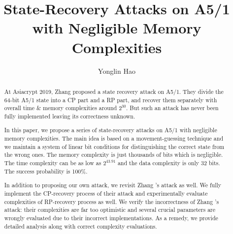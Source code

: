 
\renewcommand{\algorithmicrequire}{\textbf{Input:}}
\renewcommand{\algorithmicensure}{\textbf{Output:}}

        
\mainmatter
\title{State-Recovery Attacks on A5/1 with Negligible Memory Complexities}
\author{Yonglin Hao}
\maketitle


%




\begin{abstract}
At Asiacrypt 2019, Zhang \etal proposed a state recovery attack on A5/1.
They divide the 64-bit A5/1 state into a CP part and a RP part, and recover them separately with overall time \& memory complexities around $2^{30}$.
But such an attack has never been fully implemented leaving its correctness unknown.

In this paper, we propose a series of state-recovery attacks on A5/1 with negligible memory complexities.
The main idea is based on a movement-guessing technique and we maintain a system of linear bit conditions for distinguishing the correct state from the wrong ones.
The memory complexity is just thousands of bits which is negligible.
The time complexity can be as low as $2^{43.91}$ and the data complexity is only 32 bits.
The success probability is 100\%.

In addition to proposing our own attack, we revisit Zhang \etal's attack as well.
We fully implement the CP-recovery process of their attack and experimentally evaluate complexities of RP-recovery process as well.
We verify the incorrectness of Zhang \etal's attack: their complexities are far too optimistic and several crucial parameters are wrongly evaluated due to their incorrect implementations.
As a remedy, we provide detailed analysis along with correct complexity evaluations.
\end{abstract}

